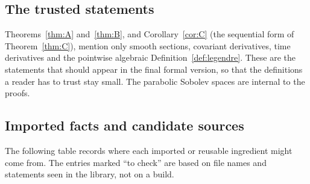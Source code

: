 \documentclass[11pt,reqno]{amsart}
\theoremstyle{definition}
\theoremstyle{remark}
\numberwithin{equation}{section}
\begin{document}
\subsection{The trusted statements}

Theorems~\ref{thm:A} and~\ref{thm:B}, and Corollary~\ref{cor:C} (the sequential form of
Theorem~\ref{thm:C}), mention only
smooth sections, covariant derivatives, time derivatives and the pointwise algebraic
Definition~\ref{def:legendre}. These are the statements that should appear in the final formal
version, so that the definitions a reader has to trust stay small. The parabolic Sobolev spaces are
internal to the proofs.

\subsection{Imported facts and candidate sources}

The following table records where each imported or reusable ingredient might come from. The entries
marked ``to check'' are based on file names and statements seen in the library, not on a build.
\end{document}
